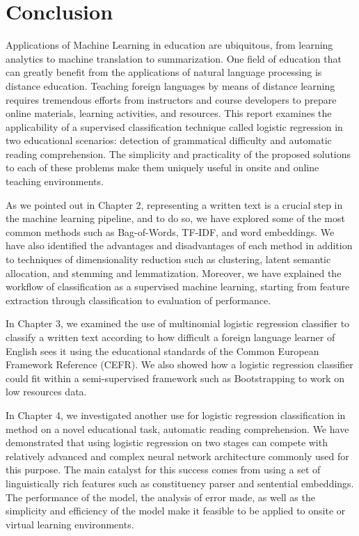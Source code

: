 
\chapter{Conclusion} %

\label{Chapter5} %

Applications of Machine Learning in education are ubiquitous, from learning analytics to machine translation to summarization. One field of education that can greatly benefit from the applications of natural language processing is distance education. Teaching foreign languages by means of distance learning requires tremendous efforts from instructors and course developers to prepare online materials, learning activities, and resources. This report examines the applicability of a supervised classification technique called logistic regression in two educational scenarios: detection of grammatical difficulty and automatic reading comprehension. The simplicity and practicality of the proposed solutions to each of these problems make them uniquely useful in onsite and online teaching environments. 

As we pointed out in Chapter 2, representing a written text is a crucial step in the machine learning pipeline, and to do so, we have explored some of the most common methods such as Bag-of-Words, TF-IDF, and word embeddings.  We have also identified the advantages and disadvantages of each method in addition to techniques of dimensionality reduction such as clustering, latent semantic allocation, and stemming and lemmatization. Moreover, we have explained the workflow of classification as a supervised machine learning, starting from feature extraction through classification to evaluation of performance. 

In Chapter 3, we examined the use of multinomial logistic regression classifier to classify a written text according to how difficult a foreign language learner of English sees it using the educational standards of the Common European Framework Reference (CEFR). We also showed how a logistic regression classifier could fit within a semi-supervised framework such as Bootstrapping to work on low resources data. 

In Chapter 4, we investigated another use for logistic regression classification in method on a novel educational task, automatic reading comprehension. We have demonstrated that using logistic regression on two stages can compete with relatively advanced and complex neural network architecture commonly used for this purpose. The main catalyst for this success comes from using a set of linguistically rich features such as constituency parser and sentential embeddings. The performance of the model, the analysis of error made, as well as the simplicity and efficiency of the model make it feasible to be applied to onsite or virtual learning environments.


